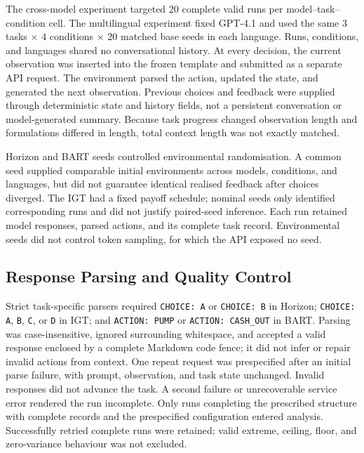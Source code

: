 \documentclass[logo,msc]{infthesis}
\begin{document}
The cross-model experiment targeted 20 complete valid runs per model--task--condition cell. The multilingual experiment fixed GPT-4.1 and used the same $3$ tasks $\times$ $4$ conditions $\times$ $20$ matched base seeds in each language. Runs, conditions, and languages shared no conversational history. At every decision, the current observation was inserted into the frozen template and submitted as a separate API request. The environment parsed the action, updated the state, and generated the next observation. Previous choices and feedback were supplied through deterministic state and history fields, not a persistent conversation or model-generated summary. Because task progress changed observation length and formulations differed in length, total context length was not exactly matched.

Horizon and BART seeds controlled environmental randomisation. A common seed supplied comparable initial environments across models, conditions, and languages, but did not guarantee identical realised feedback after choices diverged. The IGT had a fixed payoff schedule; nominal seeds only identified corresponding runs and did not justify paired-seed inference. Each run retained model responses, parsed actions, and its complete task record. Environmental seeds did not control token sampling, for which the API exposed no seed.

\subsection{Response Parsing and Quality Control}

Strict task-specific parsers required \texttt{CHOICE: A} or \texttt{CHOICE: B} in Horizon; \texttt{CHOICE: A}, \texttt{B}, \texttt{C}, or \texttt{D} in IGT; and \texttt{ACTION: PUMP} or \texttt{ACTION: CASH\_OUT} in BART. Parsing was case-insensitive, ignored surrounding whitespace, and accepted a valid response enclosed by a complete Markdown code fence; it did not infer or repair invalid actions from context. One repeat request was prespecified after an initial parse failure, with prompt, observation, and task state unchanged. Invalid responses did not advance the task. A second failure or unrecoverable service error rendered the run incomplete. Only runs completing the prescribed structure with complete records and the prespecified configuration entered analysis. Successfully retried complete runs were retained; valid extreme, ceiling, floor, and zero-variance behaviour was not excluded.
\end{document}
